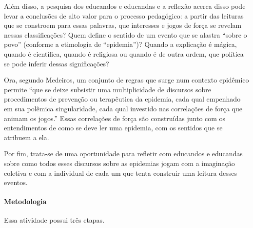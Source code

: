\documentclass[12pt]{extarticle}
\begin{document}
Além disso, a pesquisa dos educandos e educandas e a reflexão acerca
disso pode levar a conclusões de alto valor para o processo pedagógico:
a partir das leituras que se constroem para essas palavras, que
interesses e jogos de força se revelam nessas classificações? Quem
define o sentido de um evento que se alastra ``sobre o povo'' (conforme
a etimologia de ``epidemia'')? Quando a explicação é mágica, quando é
científica, quando é religiosa ou quando é de outra ordem, que política
se pode inferir dessas significações?

Ora, segundo Medeiros, um conjunto de regras que surge num contexto
epidêmico permite ``que se deixe subsistir uma multiplicidade de
discursos sobre procedimentos de prevenção ou terapêutica da epidemia,
cada qual empenhado em sua polêmica singularidade, cada qual investido
nas correlações de força que animam os jogos.'' Essas correlações de
força são construídas junto com os entendimentos de como se deve ler uma
epidemia, com os sentidos que se atribuem a ela.

Por fim, trata-se de uma oportunidade para refletir com educandos e
educandas sobre como todos esses discursos sobre as epidemias jogam com
a imaginação coletiva e com a individual de cada um que tenta construir
uma leitura desses eventos.

\paragraph{Metodologia}

Essa atividade possui três etapas. 
\end{document}
